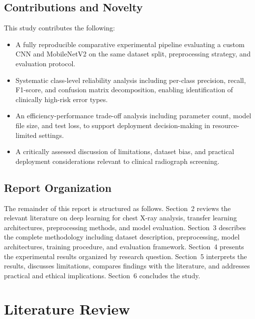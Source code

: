 \documentclass[preprint,12pt]{elsarticle}
\begin{document}
\subsection{Contributions and Novelty}
This study contributes the following:
\begin{itemize}
  \item A fully reproducible comparative experimental pipeline
        evaluating a custom CNN and MobileNetV2 on the same dataset
        split, preprocessing strategy, and evaluation protocol.
  \item Systematic class-level reliability analysis including per-class
        precision, recall, F1-score, and confusion matrix decomposition,
        enabling identification of clinically high-risk error types.
  \item An efficiency-performance trade-off analysis including parameter
        count, model file size, and test loss, to support deployment
        decision-making in resource-limited settings.
  \item A critically assessed discussion of limitations, dataset bias,
        and practical deployment considerations relevant to clinical
        radiograph screening.
\end{itemize}

\subsection{Report Organization}
The remainder of this report is structured as follows.
Section~2 reviews the relevant literature on deep learning for chest
X-ray analysis, transfer learning architectures, preprocessing methods,
and model evaluation.
Section~3 describes the complete methodology including dataset
description, preprocessing, model architectures, training procedure,
and evaluation framework.
Section~4 presents the experimental results organized by research
question.
Section~5 interprets the results, discusses limitations, compares
findings with the literature, and addresses practical and ethical
implications.
Section~6 concludes the study.

\section{Literature Review}
\end{document}
